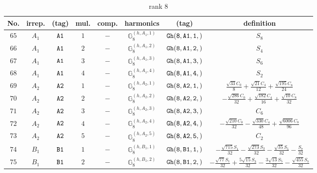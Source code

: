 \documentclass[fleqn,8pt]{jsarticle}
\begin{document}
\begin{table}[ht!]
\begin{center}
\caption{rank 8}
\renewcommand{\arraystretch}{1.3}
\begin{tabular}{cccccccc} \hline \hline
No. & irrep. & (tag) & mul. & comp. & harmonics & (tag) & definition \\ \hline
$ 65 $ & $ A_{1} $ & $ {\tt A1} $ & $ 1 $ & $ - $ & $ \mathbb{G}_{8}^{(h,A_{1},1)} $ & $ {\tt Gh(8,A1,1,)} $ & $ S_{8} $ \\
$ 66 $ & $ A_{1} $ & $ {\tt A1} $ & $ 2 $ & $ - $ & $ \mathbb{G}_{8}^{(h,A_{1},2)} $ & $ {\tt Gh(8,A1,2,)} $ & $ S_{4} $ \\
$ 67 $ & $ A_{1} $ & $ {\tt A1} $ & $ 3 $ & $ - $ & $ \mathbb{G}_{8}^{(h,A_{1},3)} $ & $ {\tt Gh(8,A1,3,)} $ & $ S_{6} $ \\
$ 68 $ & $ A_{1} $ & $ {\tt A1} $ & $ 4 $ & $ - $ & $ \mathbb{G}_{8}^{(h,A_{1},4)} $ & $ {\tt Gh(8,A1,4,)} $ & $ S_{2} $ \\
$ 69 $ & $ A_{2} $ & $ {\tt A2} $ & $ 1 $ & $ - $ & $ \mathbb{G}_{8}^{(h,A_{2},1)} $ & $ {\tt Gh(8,A2,1,)} $ & $ \frac{\sqrt{33} C_{0}}{8} + \frac{\sqrt{21} C_{4}}{12} + \frac{\sqrt{195} C_{8}}{24} $ \\
$ 70 $ & $ A_{2} $ & $ {\tt A2} $ & $ 2 $ & $ - $ & $ \mathbb{G}_{8}^{(h,A_{2},2)} $ & $ {\tt Gh(8,A2,2,)} $ & $ - \frac{\sqrt{286} C_{0}}{32} + \frac{\sqrt{182} C_{4}}{16} + \frac{\sqrt{10} C_{8}}{32} $ \\
$ 71 $ & $ A_{2} $ & $ {\tt A2} $ & $ 3 $ & $ - $ & $ \mathbb{G}_{8}^{(h,A_{2},3)} $ & $ {\tt Gh(8,A2,3,)} $ & $ C_{6} $ \\
$ 72 $ & $ A_{2} $ & $ {\tt A2} $ & $ 4 $ & $ - $ & $ \mathbb{G}_{8}^{(h,A_{2},4)} $ & $ {\tt Gh(8,A2,4,)} $ & $ - \frac{\sqrt{210} C_{0}}{32} - \frac{\sqrt{330} C_{4}}{48} + \frac{\sqrt{6006} C_{8}}{96} $ \\
$ 73 $ & $ A_{2} $ & $ {\tt A2} $ & $ 5 $ & $ - $ & $ \mathbb{G}_{8}^{(h,A_{2},5)} $ & $ {\tt Gh(8,A2,5,)} $ & $ C_{2} $ \\
$ 74 $ & $ B_{1} $ & $ {\tt B1} $ & $ 1 $ & $ - $ & $ \mathbb{G}_{8}^{(h,B_{1},1)} $ & $ {\tt Gh(8,B1,1,)} $ & $ - \frac{\sqrt{715} S_{1}}{32} - \frac{\sqrt{273} S_{3}}{32} - \frac{\sqrt{35} S_{5}}{32} - \frac{S_{7}}{32} $ \\
$ 75 $ & $ B_{1} $ & $ {\tt B1} $ & $ 2 $ & $ - $ & $ \mathbb{G}_{8}^{(h,B_{1},2)} $ & $ {\tt Gh(8,B1,2,)} $ & $ - \frac{\sqrt{77} S_{1}}{32} + \frac{5 \sqrt{15} S_{3}}{32} - \frac{3 \sqrt{13} S_{5}}{32} - \frac{\sqrt{455} S_{7}}{32} $ \\

\end{tabular}
\end{center}
\end{table}
\end{document}
